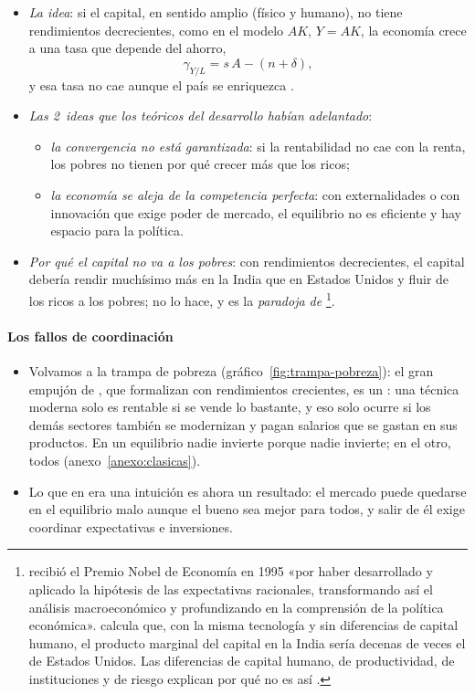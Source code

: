 \documentclass[11pt]{article}
\begin{document}
\begin{itemize}
\item \emph{La idea}: si el capital, en sentido amplio (físico y humano), no tiene rendimientos decrecientes, como en el modelo $AK$, $Y=AK$, la economía crece a una tasa que depende del ahorro,
  \[
  \gamma_{Y/L}=s\,A-(n+\delta),
  \]
  y esa tasa no cae aunque el país se enriquezca\nocite{Rebelo1991Long} .
\item \emph{Las 2~ideas que los teóricos del desarrollo habían adelantado}:
  \begin{itemize}
  \item \emph{la convergencia no está garantizada}: si la rentabilidad no cae con la renta, los pobres no tienen por qué crecer más que los ricos;
  \item \emph{la economía se aleja de la competencia perfecta}: con externalidades o con innovación que exige poder de mercado, el equilibrio no es eficiente y hay espacio para la política.
  \end{itemize}
\item \emph{Por qué el capital no va a los pobres}: con rendimientos decrecientes, el capital debería rendir muchísimo más en la India que en Estados Unidos y fluir de los ricos a los pobres; no lo hace, y es la \emph{paradoja de }\nocite{Lucas1990Why}\footnote{ recibió el Premio Nobel de Economía en 1995 «por haber desarrollado y aplicado la hipótesis de las expectativas racionales, transformando así el análisis macroeconómico y profundizando en la comprensión de la política económica»\nocite{NobelPrize1995Lucas}.  calcula que, con la misma tecnología y sin diferencias de capital humano, el producto marginal del capital en la India sería decenas de veces el de Estados Unidos. Las diferencias de capital humano, de productividad, de instituciones y de riesgo explican por qué no es así .}.
\end{itemize}

\paragraph{Los fallos de coordinación}

\begin{itemize}
\item Volvamos a la trampa de pobreza (gráfico~\ref{fig:trampa-pobreza}): el gran empujón de , que \textcite{MurphyShleiferVishny1989Industrialization} formalizan con rendimientos crecientes, es un : una técnica moderna solo es rentable si se vende lo bastante, y eso solo ocurre si los demás sectores también se modernizan y pagan salarios que se gastan en sus productos. En un equilibrio nadie invierte porque nadie invierte; en el otro, todos (anexo~\ref{anexo:clasicas}).
\item Lo que en  era una intuición es ahora un resultado: el mercado puede quedarse en el equilibrio malo aunque el bueno sea mejor para todos, y salir de él exige coordinar expectativas e inversiones.
\end{itemize}
\end{document}
